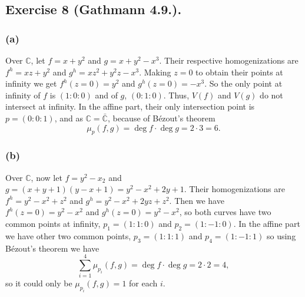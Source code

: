 \documentclass[11pt,a4paper]{article}
\begin{document}
\subsection*{Exercise 8 (Gathmann 4.9.).}

\subsubsection*{(a)}
Over $ \mathbb C $, let $ f = x + y^2 $ and $ g = x + y^2 - x^3 $. Their respective homogenizations are $ f^{h} = xz +y^2 $ and $ g^{h} = xz^2 + y^2z - x^3 $. Making $ z = 0 $ to obtain their points at infinity we get $ f^{h}(z=0) = y^2 $ and $ g^{h}(z=0) = -x^3 $. So the only point at infinity of $ f $ is $ (1:0:0) $ and of $ g $, $ (0:1:0) $. Thus, $ V(f) $ and $ V(g) $ do not intersect at infinity. In the affine part, their only intersection point is $ p = (0:0:1) $, and as $ \mathbb C = \bar{\mathbb C}$, because of Bézout's theorem
$$
  \mu_p(f, g) = \deg f \cdot \deg g = 2 \cdot 3 = 6.
$$

\subsubsection*{(b)}
Over $ \mathbb C $, now let $ f = y^2 - x_2 $ and $ g = (x + y + 1) (y - x + 1) = y^2 - x^2 + 2y + 1 $. Their homogenizations are $ f^h = y^2 - x^2 + z^2 $ and $ g^h = y^2 - x^2 + 2yz + z^2 $. Then we have $ f^h(z=0) = y^2 - x^2 $ and $ g^h(z=0) = y^2 - x^2 $, so both curves have two common points at infinity, $ p_1 = (1:1:0) $ and $ p_2 = (1:-1:0) $. In the affine part we have other two common points, $ p_3 = (1:1:1) $ and $ p_4 = (1:-1:1) $ so using Bézout's theorem we have
$$
  \sum_{i=1}^{4} \mu_{p_i}(f, g) = \deg f \cdot \deg g = 2 \cdot 2 = 4,
$$
so it could only be $ \mu_{p_i}(f, g) = 1 $ for each $ i $.

\newpage
\end{document}
